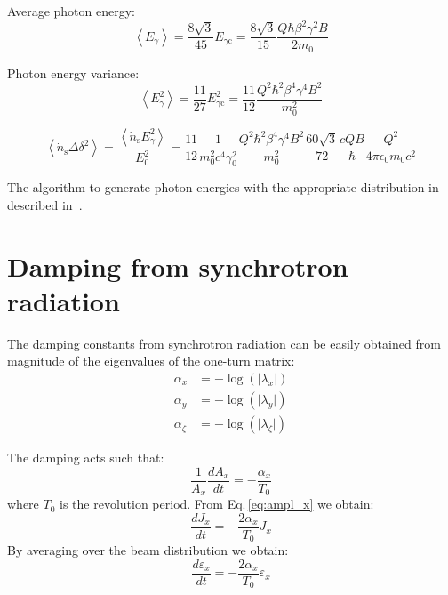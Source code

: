 Average photon energy:
\begin{equation}
\left\langle E_\gamma\right\rangle=\frac{8 \sqrt{3}}{45} E_{\gamma \mathrm{c}}
=\frac{8 \sqrt{3}}{15} 
\frac{ Q \hbar\beta^2 \gamma^2 B }{2 m_0}
\end{equation}

Photon energy variance:
\begin{equation}
\left\langle E_\gamma^2\right\rangle=\frac{11}{27} E_{\gamma \mathrm{c}}^2
= 
\frac{11}{12}\frac{ Q^2\hbar^2\beta^4\gamma^4 B^2 }{ m_0^2}
\end{equation}

\begin{equation}
\left\langle \dot{n}_{\mathrm{s}} \Delta \delta ^2\right\rangle
=
\frac{\left\langle \dot{n}_{\mathrm{s}} {E_\gamma^2}
 \right\rangle} {E_0^2}
= 
\frac{11}{12}
\frac{1}{m_0^2 c^4 \gamma_0^2 }
\frac{ Q^2\hbar^2\beta^4\gamma^4 B^2 }{ m_0^2}
\frac{60 \sqrt{3}}{72}
\frac{ c Q B}{\hbar}
\frac{Q^2}{4 \pi \epsilon_0 m_0 c^2}
\end{equation}

The algorithm to generate photon energies with the appropriate distribution in described in~\cite{helmut_synrad_90}.



\section{Damping from synchrotron radiation}
\label{section:sr_damping_times}

The damping constants from synchrotron radiation can be easily obtained from magnitude of the eigenvalues of the one-turn matrix:
\begin{align}
\alpha_x &= -\log( \lvert \lambda_x \rvert)\\
\alpha_y &= -\log( \lvert \lambda_y \rvert)\\
\alpha_\zeta &= -\log( \lvert \lambda_\zeta \rvert)
\end{align}

The damping acts such that:
\begin{equation}
\frac{1}{A_x} \frac{dA_x}{dt} = - \frac{\alpha_x}{T_0} 
\end{equation}
where $T_0$ is the revolution period.
From Eq.\,\ref{eq:ampl_x} we obtain:
\begin{equation}
\frac{dJ_x}{dt} = - \frac{2\alpha_x}{T_0}  J_x
\end{equation}
By averaging over the beam distribution we obtain:
\begin{equation}
\frac{d\varepsilon_x}{dt} = - \frac{2\alpha_x}{T_0}  \varepsilon_x
\label{eq:grate_rad_damp}
\end{equation}

